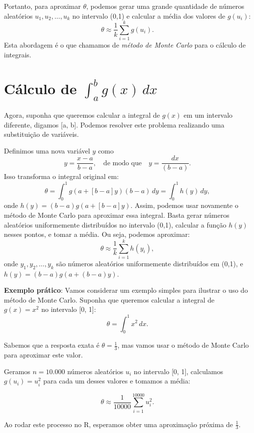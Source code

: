 \documentclass[
]{book}
\begin{document}
Portanto, para aproximar \(\theta\), podemos gerar uma grande quantidade
de números aleatórios \(u_1, u_2, \ldots, u_k\) no intervalo (0,1) e
calcular a média dos valores de \(g(u_i)\):
\[\theta \approx \frac{1}{k}\sum_{i=1}^{k}g(u_i).\] Esta abordagem é o
que chamamos de \emph{método de Monte Carlo} para o cálculo de integrais.

\section{\texorpdfstring{Cálculo de \(\int_{a}^{b}g(x)\, dx\)}{Cálculo de \textbackslash int\_\{a\}\^{}\{b\}g(x)\textbackslash, dx}}\label{cuxe1lculo-de-int_abgx-dx}

Agora, suponha que queremos calcular a integral de \(g(x)\) em um
intervalo diferente, digamos {[}a, b{]}. Podemos resolver este problema
realizando uma substituição de variáveis.

Definimos uma nova variável \(y\) como
\[y=\frac{x-a}{b-a}, \quad \text{de modo que} \quad y = \frac{dx}{(b-a)}.\]
Isso transforma o integral original em:
\[\theta = \int_{0}^{1}g(a+[b-a]y)(b-a)\,dy = \int_{0}^{1}h(y)\,dy,\]
onde \(h(y) = (b-a)g(a+[b-a]y)\). Assim, podemos usar novamente o método
de Monte Carlo para aproximar essa integral. Basta gerar números
aleatórios uniformemente distribuídos no intervalo (0,1), calcular a
função \(h(y)\) nesses pontos, e tomar a média. Ou seja, podemos
aproximar: \[
\theta \approx \frac{1}{k} \sum_{i=1}^{k} h(y_i),
\] onde \(y_1, y_2, \ldots, y_k\) são números aleatórios uniformemente
distribuídos em (0,1), e \(h(y) = (b - a)g(a + (b - a)y)\).

\textbf{Exemplo prático}: Vamos considerar um exemplo simples para ilustrar o
uso do método de Monte Carlo. Suponha que queremos calcular a integral
de \(g(x) = x^2\) no intervalo {[}0, 1{]}: \[\theta = \int_{0}^{1} x^2\, dx.\]

Sabemos que a resposta exata é \(\theta = \frac{1}{3}\), mas vamos usar o
método de Monte Carlo para aproximar este valor.

Geramos \(n = 10.000\) números aleatórios \(u_i\) no intervalo {[}0, 1{]},
calculamos \(g(u_i) = u_i^2\) para cada um desses valores e tomamos a
média:

\[\theta \approx \frac{1}{10000} \sum_{i=1}^{10000} u_i^2.\]

Ao rodar este processo no R, esperamos obter uma aproximação próxima de
\(\frac{1}{3}\).
\end{document}

